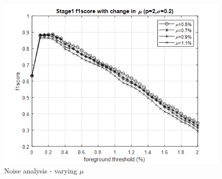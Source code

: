 \begin{figure}[ht]
    \centering
    \includegraphics[width=\linewidth]{images/noise-analysis-mog-mu.png}
    \caption{Noise analysis - varying $\mu$}
    \label{fig:noise-analysis-mog-mu}
\end{figure}